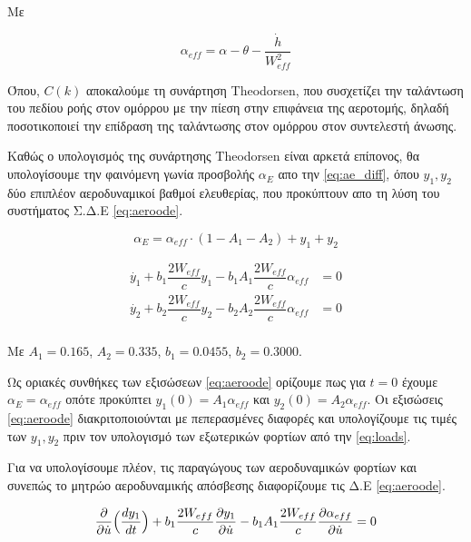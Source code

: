 \noindent
Με

\begin{equation}
\alpha_{eff} = \alpha - \theta -\dfrac{\dot{h}}{W_{eff}^2}
    \label{eq:aeff_uns}
\end{equation}


\noindent
Όπου, $C(k)$ αποκαλούμε τη συνάρτηση Theodorsen, που συσχετίζει την ταλάντωση του πεδίου ροής στον ομόρρου με την πίεση στην επιφάνεια της αεροτομής, δηλαδή ποσοτικοποιεί την επίδραση της ταλάντωσης στον ομόρρου στον συντελεστή άνωσης. 

Καθώς ο υπολογισμός της συνάρτησης Theodorsen είναι αρκετά επίπονος, θα υπολογίσουμε την φαινόμενη γωνία προσβολής $\alpha_E$ απο την \cref{eq:ae_diff}, όπου $y_1, y_2$ δύο επιπλέον αεροδυναμικοί βαθμοί ελευθερίας, που προκύπτουν απο τη λύση του συστήματος Σ.Δ.Ε \ref{eq:aeroode}.

\begin{equation}
    \alpha_{E} = \alpha_{eff}\cdot (1-A_1-A_2)+y_1+y_2
    \label{eq:ae_diff}
\end{equation}

\begin{equation}
    \begin{aligned}
        \dot{y_1} + b_1\dfrac{2W_{eff}}{c}y_1-b_1A_1\dfrac{2W_{eff}}{c}\alpha_{eff} &=0\\
        \dot{y_2} + b_2\dfrac{2W_{eff}}{c}y_2-b_2A_2\dfrac{2W_{eff}}{c}\alpha_{eff} &=0\\
    \end{aligned}
    \label{eq:aeroode}
\end{equation}

\noindent Με $A_1=0.165$, $A_2=0.335$, $b_1=0.0455$, $b_2=0.3000$.

\vspace{0.5cm}

Ως οριακές συνθήκες των εξισώσεων \ref{eq:aeroode} ορίζουμε πως για $t=0$ έχουμε $\alpha_{E}=\alpha_{eff}$ οπότε προκύπτει $y_1(0) = A_1\alpha_{eff}$ και $y_2(0) = A_2\alpha_{eff}$. Οι εξισώσεις \ref{eq:aeroode} διακριτοποιούνται με πεπερασμένες διαφορές και υπολογίζουμε τις τιμές των $y_1,y_2$ πριν τον υπολογισμό των εξωτερικών φορτίων από την \cref{eq:loads}.

Για να υπολογίσουμε πλέον, τις παραγώγους των αεροδυναμικών φορτίων και συνεπώς το μητρώο αεροδυναμικής απόσβεσης διαφορίζουμε τις Δ.Ε \ref{eq:aeroode}.

\begin{equation}
    \dfrac{\partial }{\partial \dot{u}}\Big(\dfrac{dy_1}{dt}\Big) + b_1\dfrac{2W_{eff}}{c}\dfrac{\partial y_1}{\partial \dot{u}}-b_1A_1\dfrac{2W_{eff}}{c}\dfrac{\partial \alpha_{eff}}{\partial \dot{u}} = 0
    \label{eq:diffOde}
\end{equation}

